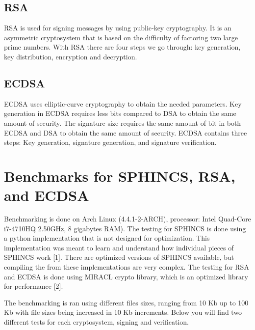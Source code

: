 \documentclass[]{scrartcl}
\begin{document}
\subsection*{RSA}
RSA is used for signing messages by using public-key cryptography. It is an asymmetric cryptosystem that is based on the difficulty of factoring two large prime numbers. With RSA there are four steps we go through: key generation, key distribution, encryption and decryption.

\subsection*{ECDSA}
ECDSA uses elliptic-curve cryptography to obtain the needed parameters. Key generation in ECDSA requires less bits compared to DSA to obtain the same amount of security. The signature size requires the same amount of bit in both ECDSA and DSA to obtain the same amount of security. ECDSA contains three steps: Key generation, signature generation, and signature verification.

\section*{Benchmarks for SPHINCS, RSA, and ECDSA}
Benchmarking is done on Arch Linux (4.4.1-2-ARCH), processor: Intel Quad-Core i7-4710HQ 2.50GHz, 8 gigabytes RAM). The testing for SPHINCS is done using a python implementation that is not designed for optimization. This implementation was meant to learn and understand how individual pieces of SPHINCS work [1]. There are optimized versions of SPHINCS available, but compiling the from these implementations are very complex. The testing for RSA and ECDSA is done using MIRACL crypto library, which is an optimized library for performance [2].

The benchmarking is ran using different files sizes, ranging from 10 Kb up to 100 Kb with file sizes being increased in 10 Kb increments. Below you will find two different tests for each cryptosystem, signing and verification.
\end{document}
